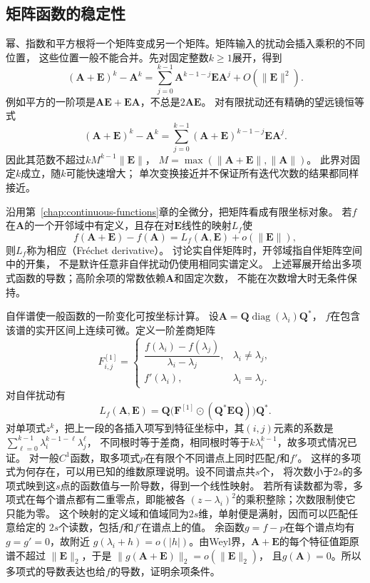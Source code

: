 \subsection{矩阵函数的稳定性}
\label{sec:linear-algebra-matrix-function-stability}
\label{sec:ch06-matrix-function-stability}


幂、指数和平方根将一个矩阵变成另一个矩阵。矩阵输入的扰动会插入乘积的不同位置，
这些位置一般不能合并。先对固定整数$k\geq1$展开，得到
\[
 (\bm A+\bm E)^k-\bm A^k
 =\sum_{j=0}^{k-1}\bm A^{k-1-j}\bm E\bm A^j+O(\lVert\bm E\rVert^2).
\]
例如平方的一阶项是$\bm A\bm E+\bm E\bm A$，不总是$2\bm A\bm E$。
对有限扰动还有精确的望远镜恒等式
\[
 (\bm A+\bm E)^k-\bm A^k
 =\sum_{j=0}^{k-1}(\bm A+\bm E)^{k-1-j}\bm E\bm A^j.
\]
因此其范数不超过$kM^{k-1}\lVert\bm E\rVert$，
$M=\max(\lVert\bm A+\bm E\rVert,\lVert\bm A\rVert)$。
此界对固定$k$成立，随$k$可能快速增大；
单次变换接近并不保证所有迭代次数的结果都同样接近。

沿用第~\ref{chap:continuous-functions}章的全微分，把矩阵看成有限坐标对象。
若$f$在$\bm A$的一个开邻域中有定义，且存在对$\bm E$线性的映射$L_f$使
\begin{equation}
 f(\bm A+\bm E)-f(\bm A)
 =L_f(\bm A,\bm E)+o(\lVert\bm E\rVert),
 \label{eq:matrix-analysis-frechet-derivative}
\end{equation}
则$L_f$称为相应（Fréchet derivative）。
讨论实自伴矩阵时，开邻域指自伴矩阵空间中的开集，
不是默许任意非自伴扰动仍使用相同实谱定义。
上述幂展开给出多项式函数的导数；高阶余项的常数依赖$\bm A$和固定次数，
不能在次数增大时无条件保持。

自伴谱使一般函数的一阶变化可按坐标计算。
设$\bm A=\bm Q\operatorname{diag}(\lambda_i)\bm Q^*$，
$f$在包含该谱的实开区间上连续可微。定义一阶差商矩阵
\[
 F^{[1]}_{i,j}=
 \begin{cases}
  \dfrac{f(\lambda_i)-f(\lambda_j)}{\lambda_i-\lambda_j},
    &\lambda_i\neq\lambda_j,\\[5pt]
  f'(\lambda_i),&\lambda_i=\lambda_j.
 \end{cases}
\]
对自伴扰动有
\begin{equation}
 L_f(\bm A,\bm E)
 =\bm Q\bigl(\bm F^{[1]}\odot(\bm Q^*\bm E\bm Q)\bigr)\bm Q^*.
 \label{eq:matrix-analysis-frechet-divided-difference}
\end{equation}
对单项式$z^k$，把上一段的各插入项写到特征坐标中，其$(i,j)$元素的系数是
$\sum_{\ell=0}^{k-1}\lambda_i^{k-1-\ell}\lambda_j^\ell$，
不同根时等于差商，相同根时等于$k\lambda_i^{k-1}$，故多项式情况已证。
对一般$C^1$函数，取多项式$p$在有限个不同谱点上同时匹配$f$和$f'$。
这样的多项式为何存在，可以用已知的维数原理说明。设不同谱点共$s$个，
将次数小于$2s$的多项式映到这$s$点的函数值与一阶导数，得到一个线性映射。
若所有读数都为零，多项式在每个谱点都有二重零点，即能被各
$(z-\lambda_i)^2$的乘积整除；次数限制使它只能为零。
这个映射的定义域和值域同为$2s$维，单射便是满射，因而可以匹配任意给定的
$2s$个读数，包括$f$和$f'$在谱点上的值。
余函数$g=f-p$在每个谱点均有$g=g'=0$，故附近
$g(\lambda_i+h)=o(|h|)$。由Weyl界，$\bm A+\bm E$的每个特征值距原谱不超过
$\lVert\bm E\rVert_2$，于是
$\lVert g(\bm A+\bm E)\rVert_2=o(\lVert\bm E\rVert_2)$，
且$g(\bm A)=0$。所以多项式的导数表达也给$f$的导数，证明余项条件。

